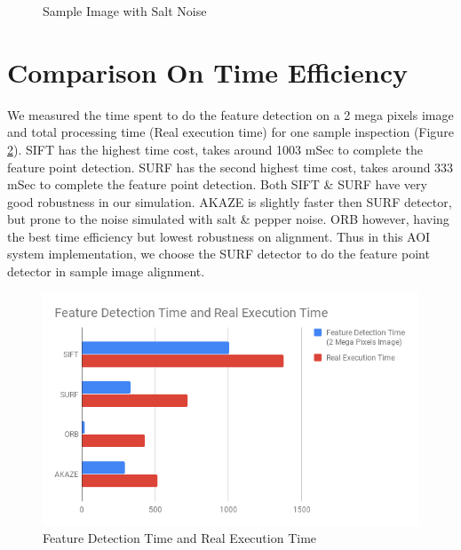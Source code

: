 \begin{figure}[H]
			\caption{Sample Image with Salt Noise}
			\label{fig:testSamplesOfSalt}
		\end{figure}

\section{Comparison On Time Efficiency}
	We measured the time spent to do the feature detection on a 2 mega pixels image and total processing time (Real execution time) for one sample inspection (Figure \ref{fig:FeatureDetectionTimeandRealExecutionTime}).
	SIFT has the highest time cost, takes around 1003 mSec to complete the feature point detection. 
	SURF has the second highest time cost, takes around 333 mSec to complete the feature point detection. 
	Both SIFT \& SURF have very good robustness in our simulation.
	AKAZE is slightly faster then SURF detector, but prone to the noise simulated with salt \& pepper noise.
	ORB however, having the best time efficiency but lowest robustness on alignment.
	Thus in this AOI system implementation, we choose the SURF detector to do the feature point detector in sample image alignment.

	\begin{figure}[H]
		\includegraphics[width=\linewidth]{figsrc/Feature Detection Time and Real Execution Time.png}
		\caption{Feature Detection Time and Real Execution Time}
		\label{fig:FeatureDetectionTimeandRealExecutionTime}
	\end{figure}





